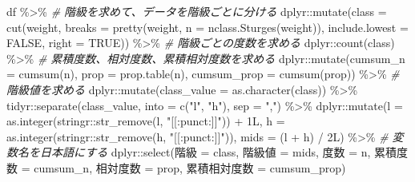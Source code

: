 \documentclass[
  12pt,
]{book}
\newenvironment{Shaded}{\begin{snugshade}}{\end{snugshade}}
\newcommand{\AttributeTok}[1]{\textcolor[rgb]{0.77,0.63,0.00}{#1}}
\newcommand{\CommentTok}[1]{\textcolor[rgb]{0.56,0.35,0.01}{\textit{#1}}}
\newcommand{\ConstantTok}[1]{\textcolor[rgb]{0.00,0.00,0.00}{#1}}
\newcommand{\FunctionTok}[1]{\textcolor[rgb]{0.00,0.00,0.00}{#1}}
\newcommand{\NormalTok}[1]{#1}
\newcommand{\OtherTok}[1]{\textcolor[rgb]{0.56,0.35,0.01}{#1}}
\newcommand{\SpecialCharTok}[1]{\textcolor[rgb]{0.00,0.00,0.00}{#1}}
\newcommand{\StringTok}[1]{\textcolor[rgb]{0.31,0.60,0.02}{#1}}
\begin{document}
\begin{Shaded}
\begin{Highlighting}[]
\NormalTok{df }\SpecialCharTok{\%\textgreater{}\%} 
  \CommentTok{\# 階級を求めて、データを階級ごとに分ける}
\NormalTok{  dplyr}\SpecialCharTok{::}\FunctionTok{mutate}\NormalTok{(}\AttributeTok{class =} \FunctionTok{cut}\NormalTok{(weight,}
                            \AttributeTok{breaks =} \FunctionTok{pretty}\NormalTok{(weight, }\AttributeTok{n =} \FunctionTok{nclass.Sturges}\NormalTok{(weight)),}
                            \AttributeTok{include.lowest =} \ConstantTok{FALSE}\NormalTok{, }\AttributeTok{right =} \ConstantTok{TRUE}\NormalTok{)) }\SpecialCharTok{\%\textgreater{}\%} 
  \CommentTok{\# 階級ごとの度数を求める}
\NormalTok{  dplyr}\SpecialCharTok{::}\FunctionTok{count}\NormalTok{(class) }\SpecialCharTok{\%\textgreater{}\%} 
  \CommentTok{\# 累積度数、相対度数、累積相対度数を求める}
\NormalTok{  dplyr}\SpecialCharTok{::}\FunctionTok{mutate}\NormalTok{(}\AttributeTok{cumsum\_n =} \FunctionTok{cumsum}\NormalTok{(n),}
                \AttributeTok{prop =} \FunctionTok{prop.table}\NormalTok{(n), }\AttributeTok{cumsum\_prop =} \FunctionTok{cumsum}\NormalTok{(prop)) }\SpecialCharTok{\%\textgreater{}\%} 
  \CommentTok{\# 階級値を求める}
\NormalTok{  dplyr}\SpecialCharTok{::}\FunctionTok{mutate}\NormalTok{(}\AttributeTok{class\_value =} \FunctionTok{as.character}\NormalTok{(class)) }\SpecialCharTok{\%\textgreater{}\%}
\NormalTok{  tidyr}\SpecialCharTok{::}\FunctionTok{separate}\NormalTok{(class\_value, }\AttributeTok{into =} \FunctionTok{c}\NormalTok{(}\StringTok{"l"}\NormalTok{, }\StringTok{"h"}\NormalTok{), }\AttributeTok{sep =} \StringTok{","}\NormalTok{) }\SpecialCharTok{\%\textgreater{}\%} 
\NormalTok{  dplyr}\SpecialCharTok{::}\FunctionTok{mutate}\NormalTok{(}\AttributeTok{l =} \FunctionTok{as.integer}\NormalTok{(stringr}\SpecialCharTok{::}\FunctionTok{str\_remove}\NormalTok{(l, }\StringTok{"[[:punct:]]"}\NormalTok{)) }\SpecialCharTok{+}\NormalTok{ 1L,}
                \AttributeTok{h =} \FunctionTok{as.integer}\NormalTok{(stringr}\SpecialCharTok{::}\FunctionTok{str\_remove}\NormalTok{(h, }\StringTok{"[[:punct:]]"}\NormalTok{)),}
                \AttributeTok{mids =}\NormalTok{ (l }\SpecialCharTok{+}\NormalTok{ h) }\SpecialCharTok{/}\NormalTok{ 2L) }\SpecialCharTok{\%\textgreater{}\%}
  \CommentTok{\# 変数名を日本語にする}
\NormalTok{  dplyr}\SpecialCharTok{::}\FunctionTok{select}\NormalTok{(}\StringTok{\textasciigrave{}}\AttributeTok{階級}\StringTok{\textasciigrave{}} \OtherTok{=}\NormalTok{ class, }\StringTok{\textasciigrave{}}\AttributeTok{階級値}\StringTok{\textasciigrave{}} \OtherTok{=}\NormalTok{ mids,}
                \StringTok{\textasciigrave{}}\AttributeTok{度数}\StringTok{\textasciigrave{}} \OtherTok{=}\NormalTok{ n, }\StringTok{\textasciigrave{}}\AttributeTok{累積度数}\StringTok{\textasciigrave{}} \OtherTok{=}\NormalTok{ cumsum\_n,}
                \StringTok{\textasciigrave{}}\AttributeTok{相対度数}\StringTok{\textasciigrave{}} \OtherTok{=}\NormalTok{ prop, }\StringTok{\textasciigrave{}}\AttributeTok{累積相対度数}\StringTok{\textasciigrave{}} \OtherTok{=}\NormalTok{ cumsum\_prop)}
\end{Highlighting}
\end{Shaded}
\end{document}
